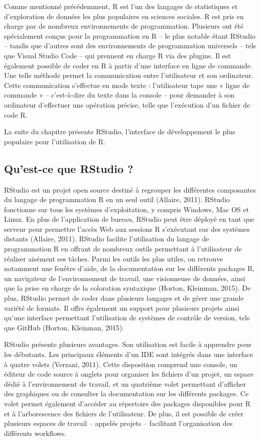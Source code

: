 \documentclass[
  letterpaper,
  DIV=11,
  numbers=noendperiod]{scrreprt}
\begin{document}
Comme mentionné précédemment, R est l'un des langages de statistiques et
d'exploration de données les plus populaires en sciences sociales. R est
pris en charge par de nombreux environnements de programmation.
Plusieurs ont été spécialement conçus pour la programmation en R -- le
plus notable étant RStudio -- tandis que d'autres sont des
environnements de programmation universels -- tels que Visual Studio
Code -- qui prennent en charge R via des plugins. Il est également
possible de coder en R à partir d'une interface en ligne de commande.
Une telle méthode permet la communication entre l'utilisateur et son
ordinateur. Cette communication s'effectue en mode texte : l'utilisateur
tape une « ligne de commande » -- c'est-à-dire du texte dans la console
-- pour demander à son ordinateur d'effectuer une opération précise,
telle que l'exécution d'un fichier de code R.

La suite du chapitre présente RStudio, l'interface de développement le
plus populaire pour l'utilisation de R.

\hypertarget{quest-ce-que-rstudio}{%
\subsection{Qu'est-ce que RStudio ?}\label{quest-ce-que-rstudio}}

RStudio est un projet open source destiné à regrouper les différentes
composantes du langage de programmation R en un seul outil (Allaire,
2011). RStudio fonctionne sur tous les systèmes d'exploitation, y
compris Windows, Mac OS et Linux. En plus de l'application de bureau,
RStudio peut être déployé en tant que serveur pour permettre l'accès Web
aux sessions R s'exécutant sur des systèmes distants (Allaire, 2011).
RStudio facilite l'utilisation du langage de programmation R en offrant
de nombreux outils permettant à l'utilisateur de réaliser aisément ses
tâches. Parmi les outils les plus utiles, on retrouve notamment une
fenêtre d'aide, de la documentation sur les différents packages R, un
navigateur de l'environnement de travail, une visionneuse de données,
ainsi que la prise en charge de la coloration syntaxique (Horton,
Kleinman, 2015). De plus, RStudio permet de coder dans plusieurs
langages et de gérer une grande variété de formats. Il offre également
un support pour plusieurs projets ainsi qu'une interface permettant
l'utilisation de systèmes de contrôle de version, tels que GitHub
(Horton, Kleinman, 2015).

RStudio présente plusieurs avantages. Son utilisation est facile à
apprendre pour les débutants. Les principaux éléments d'un IDE sont
intégrés dans une interface à quatre volets (Verzani, 2011). Cette
disposition comprend une console, un éditeur de code source à onglets
pour organiser les fichiers d'un projet, un espace dédié à
l'environnement de travail, et un quatrième volet permettant d'afficher
des graphiques ou de consulter la documentation sur les différents
packages. Ce volet permet également d'accéder au répertoire des packages
disponibles pour R et à l'arborescence des fichiers de l'utilisateur. De
plus, il est possible de créer plusieurs espaces de travail -- appelés
projets -- facilitant l'organisation des différents workflows.
\end{document}
